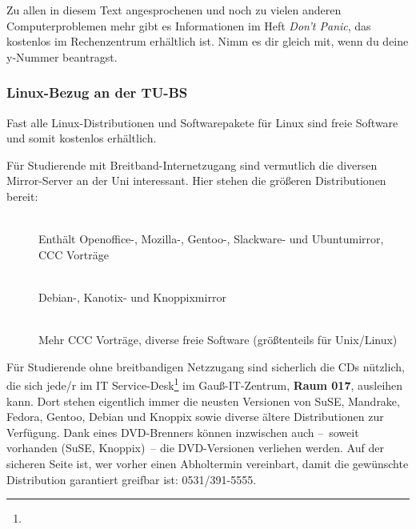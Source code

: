 		Zu allen in diesem Text angesprochenen und noch zu vielen anderen Computerproblemen mehr gibt es Informationen im Heft \emph{Don't Panic}, das kostenlos im Rechenzentrum erhältlich ist. Nimm es dir gleich mit, wenn du deine y-Nummer beantragst.

	\subsubsection{Linux-Bezug an der TU-BS}
		Fast alle Linux-Distributionen und Softwarepakete für Linux sind freie Software und somit kostenlos erhältlich.

		Für Studierende mit Breitband-Internetzugang sind vermutlich die diversen Mirror-Server an der Uni interessant. Hier stehen die größeren Distributionen bereit:
	  
		\begin{description}
			\item[]~\\Enthält Openoffice-, Mozilla-, Gentoo-, Slackware- und Ubuntumirror, CCC Vorträge
			\item[]~\\Debian-, Kanotix- und Knoppixmirror
			\item[]~\\Mehr CCC Vorträge, diverse freie Software (größtenteils für Unix/Linux)
		\end{description}

		Für Studierende ohne breitbandigen Netzzugang sind sicherlich die CDs nützlich, die sich jede/r im IT Service-Desk\footnote{} im Gauß-IT-Zentrum, \textbf{Raum 017}, ausleihen kann. Dort stehen eigentlich immer die neusten Versionen von SuSE, Mandrake, Fedora, Gentoo, Debian und Knoppix sowie diverse ältere Distributionen zur Verfügung. Dank eines DVD-Brenners können inzwischen auch --~soweit vorhanden (SuSE, Knoppix)~-- die DVD-Versionen verliehen werden. Auf der sicheren Seite ist, wer vorher einen Abholtermin vereinbart, damit die gewünschte Distribution garantiert greifbar ist: 0531/391-5555.
